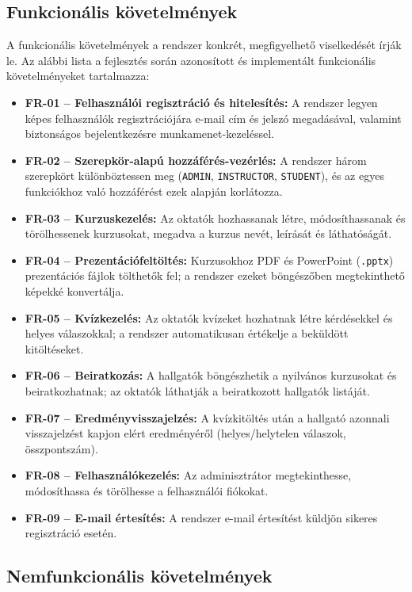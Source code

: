 \subsection{Funkcionális követelmények}

A funkcionális követelmények a rendszer konkrét, megfigyelhető viselkedését írják le. Az alábbi lista a fejlesztés során azonosított és implementált funkcionális követelményeket tartalmazza:

\begin{itemize}
    \item \textbf{FR-01 – Felhasználói regisztráció és hitelesítés:} A rendszer legyen képes felhasználók regisztrációjára e-mail cím és jelszó megadásával, valamint biztonságos bejelentkezésre munkamenet-kezeléssel.
    \item \textbf{FR-02 – Szerepkör-alapú hozzáférés-vezérlés:} A rendszer három szerepkört különböztessen meg (\texttt{ADMIN}, \texttt{INSTRUCTOR}, \texttt{STUDENT}), és az egyes funkciókhoz való hozzáférést ezek alapján korlátozza.
    \item \textbf{FR-03 – Kurzuskezelés:} Az oktatók hozhassanak létre, módosíthassanak és törölhessenek kurzusokat, megadva a kurzus nevét, leírását és láthatóságát.
    \item \textbf{FR-04 – Prezentációfeltöltés:} Kurzusokhoz PDF és PowerPoint (\texttt{.pptx}) prezentációs fájlok tölthetők fel; a rendszer ezeket böngészőben megtekinthető képekké konvertálja.
    \item \textbf{FR-05 – Kvízkezelés:} Az oktatók kvízeket hozhatnak létre kérdésekkel és helyes válaszokkal; a rendszer automatikusan értékelje a beküldött kitöltéseket.
    \item \textbf{FR-06 – Beiratkozás:} A hallgatók böngészhetik a nyilvános kurzusokat és beiratkozhatnak; az oktatók láthatják a beiratkozott hallgatók listáját.
    \item \textbf{FR-07 – Eredményvisszajelzés:} A kvízkitöltés után a hallgató azonnali visszajelzést kapjon elért eredményéről (helyes/helytelen válaszok, összpontszám).
    \item \textbf{FR-08 – Felhasználókezelés:} Az adminisztrátor megtekinthesse, módosíthassa és törölhesse a felhasználói fiókokat.
    \item \textbf{FR-09 – E-mail értesítés:} A rendszer e-mail értesítést küldjön sikeres regisztráció esetén.
\end{itemize}

\subsection{Nemfunkcionális követelmények}

